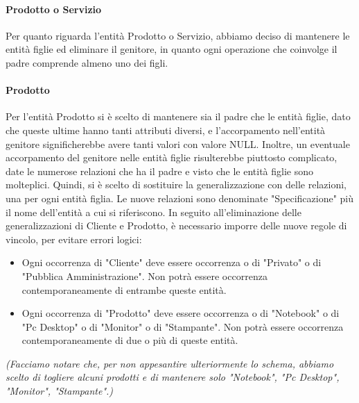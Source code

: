 \paragraph{Prodotto o Servizio}
Per quanto riguarda l'entità Prodotto o Servizio, abbiamo deciso di mantenere le entità figlie ed eliminare il genitore, in quanto ogni operazione che coinvolge il padre comprende almeno uno dei figli.
\paragraph{Prodotto}
Per l'entità Prodotto si è scelto di mantenere sia il padre che le entità figlie, dato che queste ultime hanno tanti attributi diversi, e l'accorpamento nell'entità genitore significherebbe avere tanti valori con valore NULL. Inoltre, un eventuale accorpamento del genitore nelle entità figlie risulterebbe piuttosto complicato, date le numerose relazioni che ha il padre e visto che le entità figlie sono molteplici.
Quindi, si è scelto di sostituire la generalizzazione con delle relazioni, una per ogni entità figlia. Le nuove relazioni sono denominate "Specificazione" più il nome dell'entità a cui si riferiscono.
\newline\newline
In seguito all'eliminazione delle generalizzazioni di Cliente e Prodotto, è necessario imporre delle nuove regole di vincolo, per evitare errori logici:

\begin{itemize}
  \item Ogni occorrenza di "Cliente" deve essere occorrenza o di "Privato" o di "Pubblica Amministrazione". Non potrà essere occorrenza contemporaneamente di entrambe queste entità.
  \item Ogni occorrenza di "Prodotto" deve essere occorrenza o di "Notebook" o di "Pc Desktop" o di "Monitor" o di "Stampante". Non potrà essere occorrenza contemporaneamente di due o più di queste entità.
\end{itemize}
\noindent
\textit{(Facciamo notare che, per non appesantire ulteriormente lo schema, abbiamo scelto di togliere alcuni prodotti e di mantenere solo "Notebook", "Pc Desktop", "Monitor", "Stampante".)}




%
%
%
% 
%


